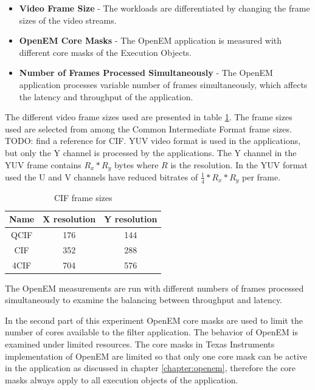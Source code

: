 \begin{itemize}
    \item \textbf{Video Frame Size} - The workloads are differentiated by
        changing the frame sizes of the video streams.
    \item \textbf{OpenEM Core Masks} - The OpenEM application is measured
        with different core masks of the Execution Objects.
    \item \textbf{Number of Frames Processed Simultaneously} - The OpenEM
        application processes variable number of frames simultaneously, which
        affects the latency and throughput of the application.
\end{itemize}

The different video frame sizes used are presented in table
\ref{tab:cif_frames}. The frame sizes used are selected from among the Common
Intermediate Format frame sizes. TODO: find a reference for CIF. YUV video
format is used in the applications, but only the Y channel is processed by the
applications. The Y channel in the YUV frame contains $R_{x} * R_{y}$ bytes
where $R$ is the resolution. In the YUV format used the U and V channels have
reduced bitrates of $\frac{1}{4} * R_{x} * R_{y}$ per frame.

\begin{table}
    \begin{center}
        \begin{tabular}{ c c c }
            Name  & X resolution  & Y resolution \\ \hline
            QCIF  & 176           & 144          \\ \hline
            CIF   & 352           & 288          \\ \hline
            4CIF  & 704           & 576          \\ \hline
        \end{tabular}
        \caption{CIF frame sizes}
        \label{tab:cif_frames}
    \end{center}
\end{table}

The OpenEM measurements are run with different numbers of frames processed
simultaneously to examine the balancing between throughput and latency.

In the second part of this experiment OpenEM core masks are used to limit the
number of cores available to the filter application. The behavior of OpenEM is
examined under limited resources. The core masks in Texas Instruments
implementation of OpenEM are limited so that only one core mask can be active in
the application as discussed in chapter \ref{chapter:openem}, therefore the core
masks always apply to all execution objects of the application.

